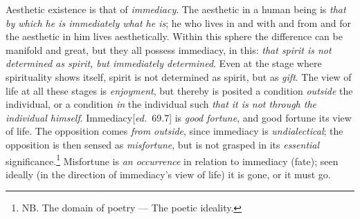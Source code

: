 \documentclass[12pt,a4paper,openany]{book}
\newcommand{\ed}[1]{{\small[\textit{ed.}\ #1]}}
\begin{document}
Aesthetic existence is that of \emph{immediacy}. The aesthetic in a
human being is \emph{that by which he is immediately what he is}; he who lives in and
with and from and for the aesthetic in him lives aesthetically. Within
this sphere the difference can be manifold and great,
but they all possess immediacy, in this: \emph{that spirit is not determined as
spirit, but immediately determined}. Even at the stage where spirituality
shows itself, spirit is not determined as spirit, but as \emph{gift}.
The view of life at all these stages is \emph{enjoyment}, but thereby is posited
a condition \emph{outside} the individual, or a condition \emph{in} the individual such
\emph{that it is not through the individual himself}. Immediacy\ed{69.7} is \emph{good fortune}, and
good fortune its view of life. The opposition comes \emph{from outside}, since
immediacy is \emph{undialectical}; the opposition is then sensed as
\emph{misfortune}, but is not grasped in its \emph{essential} significance.\footnote[52]{NB. The domain of poetry --- The poetic ideality.} Misfortune is \emph{an occurrence}
in relation to immediacy (fate); seen ideally (in the direction
of immediacy's view of life) it is gone, or it must
go.
\end{document}
